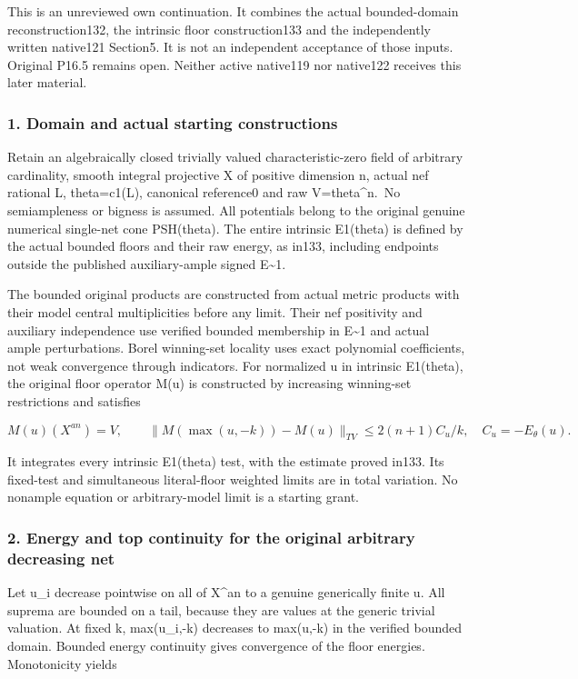 \documentclass[
  10pt,
]{article}
\begin{document}
This is an unreviewed own continuation. It combines the actual
bounded-domain reconstruction132, the intrinsic floor construction133
and the independently written native121 Section5. It is not an
independent acceptance of those inputs. Original P16.5 remains open.
Neither active native119 nor native122 receives this later material.

\subsubsection{1. Domain and actual starting
constructions}\label{domain-and-actual-starting-constructions}

Retain an algebraically closed trivially valued characteristic-zero
field of arbitrary cardinality, smooth integral projective X of positive
dimension n, actual nef rational L, theta=c1(L), canonical reference0
and raw V=theta\^{}n.~No semiampleness or bigness is assumed. All
potentials belong to the original genuine numerical single-net cone
PSH(theta). The entire intrinsic E1(theta) is defined by the actual
bounded floors and their raw energy, as in133, including endpoints
outside the published auxiliary-ample signed E\textasciitilde1.

The bounded original products are constructed from actual metric
products with their model central multiplicities before any limit. Their
nef positivity and auxiliary independence use verified bounded
membership in E\textasciitilde1 and actual ample perturbations. Borel
winning-set locality uses exact polynomial coefficients, not weak
convergence through indicators. For normalized u in intrinsic E1(theta),
the original floor operator M(u) is constructed by increasing
winning-set restrictions and satisfies

\[M(u)(X^{an})=V,\qquad
\|M(\max(u,-k))-M(u)\|_{TV}\le 2(n+1)C_u/k,
\quad C_u=-E_\theta(u).\]

It integrates every intrinsic E1(theta) test, with the estimate proved
in133. Its fixed-test and simultaneous literal-floor weighted limits are
in total variation. No nonample equation or arbitrary-model limit is a
starting grant.

\subsubsection{2. Energy and top continuity for the original arbitrary
decreasing
net}\label{energy-and-top-continuity-for-the-original-arbitrary-decreasing-net}

Let u\_i decrease pointwise on all of X\^{}an to a genuine generically
finite u. All suprema are bounded on a tail, because they are values at
the generic trivial valuation. At fixed k, max(u\_i,-k) decreases to
max(u,-k) in the verified bounded domain. Bounded energy continuity
gives convergence of the floor energies. Monotonicity yields
\end{document}
